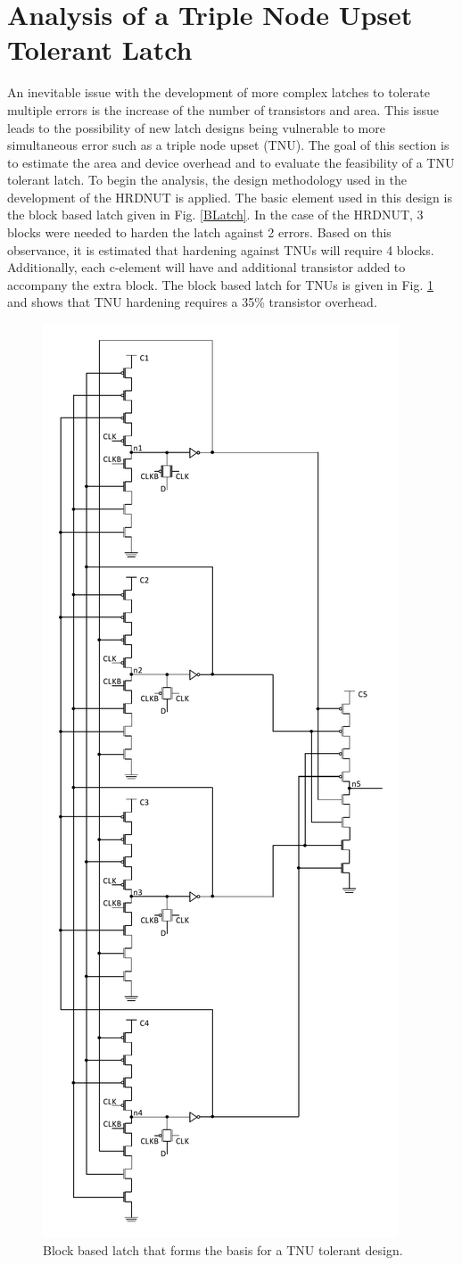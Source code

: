 \section{Analysis of a Triple Node Upset Tolerant Latch}
An inevitable issue with the development of more complex latches to tolerate multiple errors is the increase of the number of transistors and area. This issue leads to the possibility of new latch designs being vulnerable to more simultaneous error such as a triple node upset (TNU). The goal of this section is to estimate the area and device overhead and to evaluate the feasibility of a TNU tolerant latch. To begin the analysis, the design methodology used in the development of the HRDNUT is applied. The basic element used in this design is the block based latch given in Fig. \ref{BLatch}. In the case of the HRDNUT, 3 blocks were needed to harden the latch against 2 errors. Based on this observance, it is estimated that hardening against TNUs will require 4 blocks. Additionally, each c-element will have and additional transistor added to accompany the extra block. The block based latch for TNUs is given in Fig. \ref{TNUB} and shows that TNU hardening requires a 35\% transistor overhead.

\begin{figure}[!htbp]
	\centering
	\includegraphics[width=0.50\linewidth]{Figures/TNUBlatch}
	\caption{Block based latch that forms the basis for a TNU tolerant design.}
	\label{TNUB}
\end{figure}

